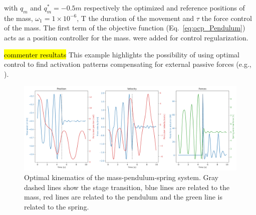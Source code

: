 \noindent with $q_m$ and $q_m^* = -0.5m$ respectively the optimized and reference positions of the mass, $\omega_1 = 1\times 10^{-6}$, T the duration of the movement and $\tau$ the force control of the mass.
The first term of the objective function (Eq.~\ref{eq:ocp_Pendulum}) acts as a position controller for the mass.
 were added for control regularization.

\hl{commenter resultats}
This example highlights the possibility of using optimal control to find activation patterns compensating for external passive forces (e.g., ).

\begin{figure}[t!]
\centering
\includegraphics[width=\textwidth]{figures/Mass_Pendulum_Fext.png}
\caption{Optimal kinematics of the mass-pendulum-spring system. Gray dashed lines show the stage transition, blue lines are related to the mass, red lines are related to the pendulum and the green line is related to the spring.}
\label{fig:Mass_Pendulum_Fext_graphs}
\end{figure}














